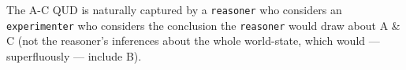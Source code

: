 \documentclass[10pt,letterpaper]{article}
\begin{document}
The A-C QUD is naturally captured by a \lstinline{reasoner} who considers an \lstinline{experimenter} who considers the conclusion the \lstinline{reasoner} would draw about A \& C (not the reasoner's inferences about the whole world-state, which would --- superfluously --- include B).



\end{document}
